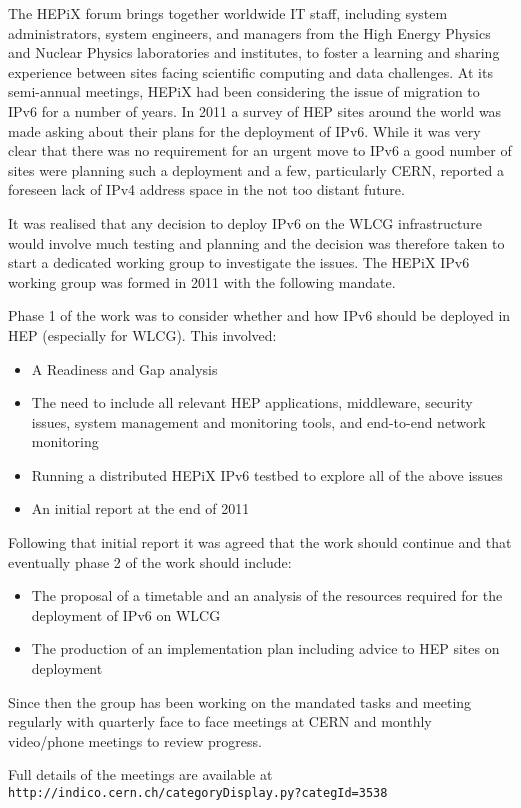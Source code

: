 The HEPiX forum brings together worldwide IT staff, including system administrators, system engineers, and managers from the High Energy Physics and Nuclear Physics laboratories and institutes, to foster a learning and sharing experience between sites facing scientific computing and data challenges. At its semi-annual meetings, HEPiX had been considering the issue of migration to IPv6 for a number of years. In 2011 a survey of HEP sites around the world was made asking about their plans for the deployment of IPv6. While it was very clear that there was no requirement for an urgent move to IPv6 a good number of sites were planning such a deployment and a few, particularly CERN, reported a foreseen lack of IPv4 address space in the not too distant future.

It was realised that any decision to deploy IPv6 on the WLCG infrastructure would involve much testing and planning and the decision was therefore taken to start a dedicated working group to investigate the issues. The HEPiX IPv6 working group was formed in 2011 with the following mandate.

Phase 1 of the work was to consider whether and how IPv6 should be deployed in HEP (especially for WLCG). This involved:
\begin {itemize}
\item A Readiness and Gap analysis
\item The need to include all relevant HEP applications, middleware, security issues, system management and monitoring tools, and end-to-end network monitoring
\item Running a distributed HEPiX IPv6 testbed to explore all of the above issues
\item An initial report at the end of 2011
\end {itemize}	
Following that initial report it was agreed that the work should continue and that eventually phase 2 of the work should include:
\begin {itemize}
\item The proposal of a timetable and an analysis of the resources required for the deployment of IPv6 on WLCG
\item The production of an implementation plan including advice to HEP sites on deployment
\end {itemize}

Since then the group has been working on the mandated tasks and meeting regularly with quarterly face to face meetings at CERN and monthly video/phone meetings to review progress. 

Full details of the meetings are available at {\tt http://indico.cern.ch/categoryDisplay.py?categId=3538}


